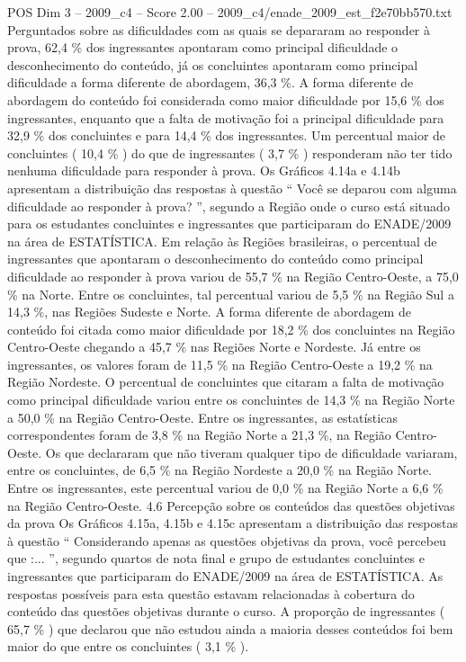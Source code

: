 \begin{textsample}{POS Dim 3 – 2009\_c4 – Score 2.00 – 2009\_c4/enade\_2009\_est\_f2e70bb570.txt}
Perguntados sobre as dificuldades com as quais se depararam ao responder à prova, 62,4 \% dos ingressantes apontaram como principal dificuldade o desconhecimento do conteúdo, já os concluintes apontaram como principal dificuldade a forma diferente de abordagem, 36,3 \%.
A forma diferente de abordagem do conteúdo foi considerada como maior dificuldade por 15,6 \% dos ingressantes, enquanto que a falta de motivação foi a principal dificuldade para 32,9 \% dos concluintes e para 14,4 \% dos ingressantes.
Um percentual maior de concluintes ( 10,4 \% ) do que de ingressantes ( 3,7 \% ) responderam não ter tido nenhuma dificuldade para responder à prova.
Os Gráficos 4.14a e 4.14b apresentam a distribuição das respostas à questão “ Você se deparou com alguma dificuldade ao responder à prova? ”, segundo a Região onde o curso está situado para os estudantes concluintes e ingressantes que participaram do ENADE/2009 na área de ESTATÍSTICA.
Em relação às Regiões brasileiras, o percentual de ingressantes que apontaram o desconhecimento do conteúdo como principal dificuldade ao responder à prova variou de 55,7 \% na Região Centro-Oeste, a 75,0 \% na Norte.
Entre os concluintes, tal percentual variou de 5,5 \% na Região Sul a 14,3 \%, nas Regiões Sudeste e Norte.
A forma diferente de abordagem de conteúdo foi citada como maior dificuldade por 18,2 \% dos concluintes na Região Centro-Oeste chegando a 45,7 \% nas Regiões Norte e Nordeste.
Já entre os ingressantes, os valores foram de 11,5 \% na Região Centro-Oeste a 19,2 \% na Região Nordeste.
O percentual de concluintes que citaram a falta de motivação como principal dificuldade variou entre os concluintes de 14,3 \% na Região Norte a 50,0 \% na Região Centro-Oeste.
Entre os ingressantes, as estatísticas correspondentes foram de 3,8 \% na Região Norte a 21,3 \%, na Região Centro-Oeste.
Os que declararam que não tiveram qualquer tipo de dificuldade variaram, entre os concluintes, de 6,5 \% na Região Nordeste a 20,0 \% na Região Norte.
Entre os ingressantes, este percentual variou de 0,0 \% na Região Norte a 6,6 \% na Região Centro-Oeste. 4.6 Percepção sobre os conteúdos das questões objetivas da prova Os Gráficos 4.15a, 4.15b e 4.15c apresentam a distribuição das respostas à questão “ Considerando apenas as questões objetivas da prova, você percebeu que :... ”, segundo quartos de nota final e grupo de estudantes concluintes e ingressantes que participaram do ENADE/2009 na área de ESTATÍSTICA.
As respostas possíveis para esta questão estavam relacionadas à cobertura do conteúdo das questões objetivas durante o curso.
A proporção de ingressantes ( 65,7 \% ) que declarou que não estudou ainda a maioria desses conteúdos foi bem maior do que entre os concluintes ( 3,1 \% ).

\end{textsample}
